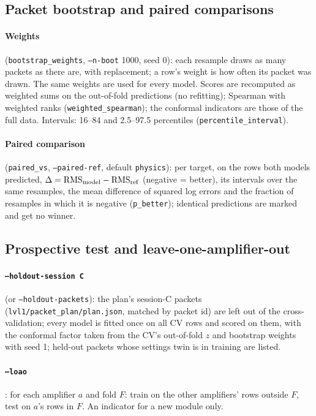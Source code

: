 \documentclass[10pt]{article}
\newcommand{\code}[1]{\texttt{#1}}
\begin{document}
\subsection{Packet bootstrap and paired comparisons}

\paragraph{Weights} (\code{bootstrap\_weights}, \code{--n-boot} 1000, seed 0): each resample draws as many packets as
there are, with replacement; a row's weight is how often its packet was drawn. The same weights are used for every
model. Scores are recomputed as weighted sums on the out-of-fold predictions (no refitting); Spearman with weighted
ranks (\code{weighted\_spearman}); the conformal indicators are those of the full data. Intervals: 16--84 and
2.5--97.5 percentiles (\code{percentile\_interval}).

\paragraph{Paired comparison} (\code{paired\_vs}, \code{--paired-ref}, default \code{physics}): per target, on the rows
both models predicted, $\Delta = \mathrm{RMS}_{\rm model} - \mathrm{RMS}_{\rm ref}$ (negative = better), its intervals
over the same resamples, the mean difference of squared log errors and the fraction of resamples in which it is negative
(\code{p\_better}); identical predictions are marked and get no winner.

\subsection{Prospective test and leave-one-amplifier-out}

\paragraph{\code{--holdout-session C}} (or \code{--holdout-packets}): the plan's session-C packets
(\code{lvl1/packet\_plan/plan.json}, matched by packet id) are left out of the cross-validation; every model is fitted
once on all CV rows and scored on them, with the conformal factor taken from the CV's out-of-fold $z$ and bootstrap
weights with seed 1; held-out packets whose settings twin is in training are listed.

\paragraph{\code{--loao}}: for each amplifier $a$ and fold $F$: train on the other amplifiers' rows outside $F$, test on
$a$'s rows in $F$. An indicator for a new module only.
\end{document}
